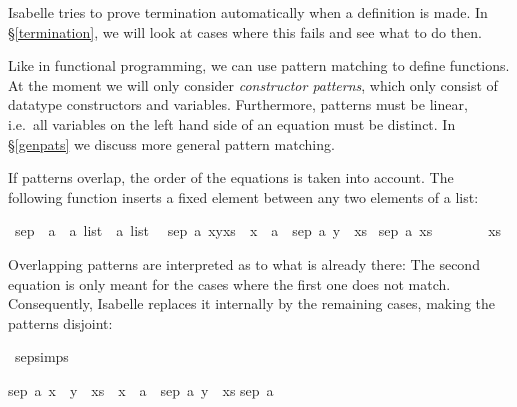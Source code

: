\begin{isabellebody}
\begin{isamarkuptext}
  Isabelle tries to prove termination automatically when a definition
  is made. In \S\ref{termination}, we will look at cases where this
  fails and see what to do then.%
\end{isamarkuptext}%
\isamarkuptrue%
%
\isamarkuptrue%
%
\begin{isamarkuptext}%
\label{patmatch}
  Like in functional programming, we can use pattern matching to
  define functions. At the moment we will only consider \emph{constructor
  patterns}, which only consist of datatype constructors and
  variables. Furthermore, patterns must be linear, i.e.\ all variables
  on the left hand side of an equation must be distinct. In
  \S\ref{genpats} we discuss more general pattern matching.

  If patterns overlap, the order of the equations is taken into
  account. The following function inserts a fixed element between any
  two elements of a list:%
\end{isamarkuptext}%
\isamarkuptrue%
\isamarkupfalse%
\ sep\ {\isacharcolon}{\isacharcolon}\ {\isachardoublequoteopen}{\isacharprime}a\ {\isasymRightarrow}\ {\isacharprime}a\ list\ {\isasymRightarrow}\ {\isacharprime}a\ list{\isachardoublequoteclose}\isanewline
{}\isanewline
\ \ {\isachardoublequoteopen}sep\ a\ {\isacharparenleft}x{\isacharhash}y{\isacharhash}xs{\isacharparenright}\ {\isacharequal}\ x\ {\isacharhash}\ a\ {\isacharhash}\ sep\ a\ {\isacharparenleft}y\ {\isacharhash}\ xs{\isacharparenright}{\isachardoublequoteclose}\isanewline
{\isacharbar}\ {\isachardoublequoteopen}sep\ a\ xs\ \ \ \ \ \ \ {\isacharequal}\ xs{\isachardoublequoteclose}%
\begin{isamarkuptext}%
Overlapping patterns are interpreted as  to what is
  already there: The second equation is only meant for the cases where
  the first one does not match. Consequently, Isabelle replaces it
  internally by the remaining cases, making the patterns disjoint:%
\end{isamarkuptext}%
\isamarkuptrue%
\isamarkupfalse%
\ sep{\isachardot}simps%
\begin{isamarkuptext}%
\begin{isabelle}%
sep\ a\ {\isacharparenleft}x\ {\isacharhash}\ y\ {\isacharhash}\ xs{\isacharparenright}\ {\isacharequal}\ x\ {\isacharhash}\ a\ {\isacharhash}\ sep\ a\ {\isacharparenleft}y\ {\isacharhash}\ xs{\isacharparenright}\isasep\isanewline%
sep\ a\ {\isacharbrackleft}{\isacharbrackright}\ {\isacharequal}\ {\isacharbrackleft}{\isacharbrackright}\isasep\isanewline%

\end{isabelle}
\end{isamarkuptext}
\end{isabellebody}
